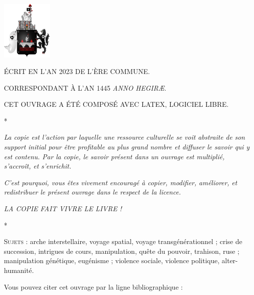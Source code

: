 \documentclass[a4paper,12pt,twoside,french]{book}
\begin{document}
    \begin{center}
    \null\vfill

      \footnotesize



      \vspace{-10em}
      \includegraphics[width=2.5cm]{ecu-fauve.pdf}


      \vspace{4em}


      \MakeUppercase{Écrit en l’an 2023 de l’Ère commune.}

      \MakeUppercase{Correspondant à l’an 1445 \emph{Anno Hegiræ}.}

      \MakeUppercase{Cet ouvrage a été composé avec \LaTeX, logiciel libre.}

      \vspace{1em}
      *

      \emph{La copie est l’action par laquelle une ressource culturelle se voit abstraite de son support initial pour être profitable au plus grand nombre et diffuser le savoir qui y est contenu. Par la copie, le savoir présent dans un ouvrage est multiplié, s’accroît, et s’enrichit.}

      \emph{C’est pourquoi, vous êtes vivement encouragé à copier, modifier, améliorer, et redistribuer le présent ouvrage dans le respect de la licence.}

      \emph{{\uppercase{La copie fait vivre le livre !}}}


      \vspace{1em}
      *

      \textsc{Sujets :} arche interstellaire, voyage spatial, voyage transgénérationnel  ; crise de succession, intrigues de cours, manipulation, quête du pouvoir, trahison, ruse ; manipulation génétique, eugénisme ; violence sociale, violence politique, alter-humanité.

      \vspace{1em}

      Vous pouvez citer cet ouvrage par la ligne bibliographique :


\end{center}
\end{document}

